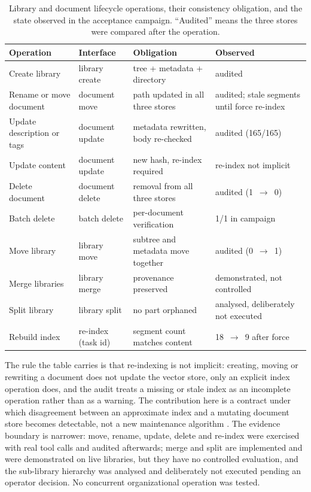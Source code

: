 \begin{table}[t]
\centering
\small
\caption{Library and document lifecycle operations, their consistency
obligation, and the state observed in the acceptance campaign. ``Audited''
means the three stores were compared after the operation.}
\label{tab:org-lifecycle}
\begin{tabular}{@{}p{}p{}p{}p{}@{}}
\toprule
Operation & Interface & Obligation & Observed \\
\midrule
Create library & library create & tree + metadata + directory & audited \\
Rename or move document & document move & path updated in all three stores & audited; stale segments until force re-index \\
Update description or tags & document update & metadata rewritten, body re-checked & audited (165/165) \\
Update content & document update & new hash, re-index required & re-index not implicit \\
Delete document & document delete & removal from all three stores & audited (1~$\rightarrow$~0) \\
Batch delete & batch delete & per-document verification & 1/1 in campaign \\
Move library & library move & subtree and metadata move together & audited (0~$\rightarrow$~1) \\
Merge libraries & library merge & provenance preserved & demonstrated, not controlled \\
Split library & library split & no part orphaned & analysed, deliberately not executed \\
Rebuild index & re-index (task id) & segment count matches content & 18~$\rightarrow$~9 after force \\
\bottomrule
\end{tabular}
\end{table}

The rule the table carries is that re-indexing is not implicit: creating,
moving or rewriting a document does not update the vector store, only an
explicit index operation does, and the audit treats a missing or stale index
as an incomplete operation rather than as a warning. The contribution here is
a contract under which disagreement between an approximate index and a
mutating document store becomes detectable, not a new maintenance algorithm
\citep{xu-spfresh-2023}. The evidence boundary is narrower: move, rename,
update, delete and re-index were exercised with real tool calls and audited
afterwards; merge and split are implemented and were demonstrated on live
libraries, but they have no controlled evaluation, and the sub-library
hierarchy was analysed and deliberately not executed pending an operator
decision. No concurrent organizational operation was tested.

